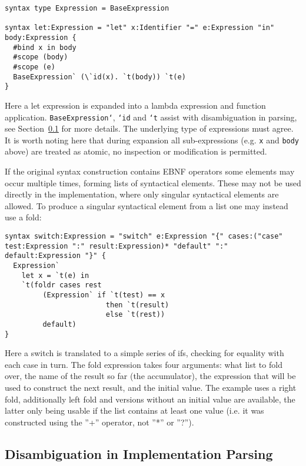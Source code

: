 \documentclass{kththesis}
\begin{document}
\begin{verbatim}
syntax type Expression = BaseExpression

syntax let:Expression = "let" x:Identifier "=" e:Expression "in" body:Expression {
  #bind x in body
  #scope (body)
  #scope (e)
  BaseExpression` (\`id(x). `t(body)) `t(e)
}
\end{verbatim}

Here a let expression is expanded into a lambda expression and function application. \texttt{BaseExpression`}, \texttt{`id} and \texttt{`t} assist with disambiguation in parsing, see Section~\ref{sec:disambiguation-implementation} for more details. The underlying type of expressions must agree. It is worth noting here that during expansion all sub-expressions (e.g. \texttt{x} and \texttt{body} above) are treated as atomic, no inspection or modification is permitted.

If the original syntax construction contains EBNF operators some elements may occur multiple times, forming lists of syntactical elements. These may not be used directly in the implementation, where only singular syntactical elements are allowed. To produce a singular syntactical element from a list one may instead use a fold:

\begin{verbatim}
syntax switch:Expression = "switch" e:Expression "{" cases:("case" test:Expression ":" result:Expression)* "default" ":" default:Expression "}" {
  Expression`
    let x = `t(e) in
    `t(foldr cases rest
         (Expression` if `t(test) == x
                        then `t(result)
                        else `t(rest))
         default)
}
\end{verbatim}

Here a switch is translated to a simple series of ifs, checking for equality with each case in turn. The fold expression takes four arguments: what list to fold over, the name of the result so far (the accumulator), the expression that will be used to construct the next result, and the initial value. The example uses a right fold, additionally left fold and versions without an initial value are available, the latter only being usable if the list contains at least one value (i.e. it was constructed using the ''+'' operator, not ''*'' or ''?'').

\subsection{Disambiguation in Implementation Parsing} \label{sec:disambiguation-implementation}
\end{document}
